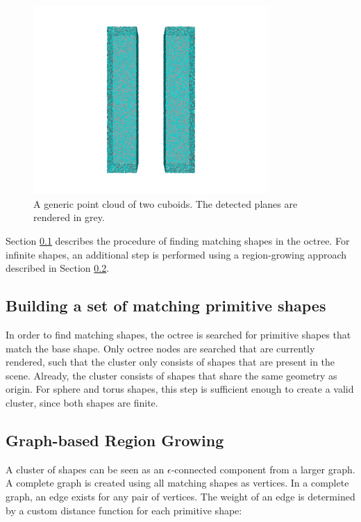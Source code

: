 \begin{figure}
    \centering
    \includegraphics[width=0.8\textwidth]{Shape_Detection/cuboids.png}
    \caption{A generic point cloud of two cuboids. The detected planes are rendered in grey.}
    \label{fig:cuboids}
\end{figure}

Section \ref{sec:matchingSetBuilding} describes the procedure of finding matching shapes in the octree. For infinite shapes, an additional step is performed using a region-growing approach described in Section \ref{sec:regionGrowing}. 


\subsection{Building a set of matching primitive shapes}
\label{sec:matchingSetBuilding}

In order to find matching shapes, the octree is searched for primitive shapes that match the base shape. Only octree nodes are searched that are currently rendered, such that the cluster only consists of shapes that are present in the scene. Already, the cluster consists of shapes that share the same geometry as origin. For sphere and torus shapes, this step is sufficient enough to create a valid cluster, since both shapes are finite. 


\subsection{Graph-based Region Growing}
\label{sec:regionGrowing}

A cluster of shapes can be seen as an $\epsilon$-connected component from a larger graph. A complete graph is created using all matching shapes as vertices. In a complete graph, an edge exists for any pair of vertices. The weight of an edge is determined by a custom distance function for each primitive shape:

